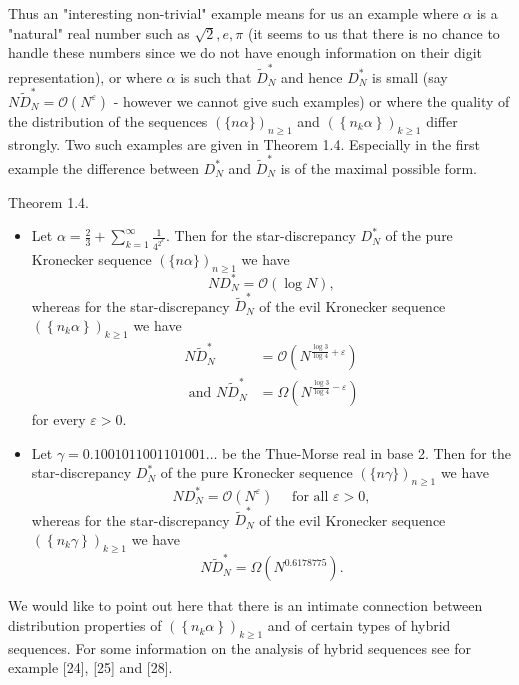 \documentclass[10pt]{article}
\begin{document}
Thus an "interesting non-trivial" example means for us an example where $\alpha$ is a "natural" real number such as $\sqrt{2}, e, \pi$ (it seems to us that there is no chance to handle these numbers since we do not have enough information on their digit representation), or where $\alpha$ is such that $\widetilde{D}_{N}^{*}$ and hence $D_{N}^{*}$ is small (say $N \widetilde{D}_{N}^{*}=\mathcal{O}\left(N^{\varepsilon}\right)$ - however we cannot give such examples) or where the quality of the distribution of the sequences $(\{n \alpha\})_{n \geqslant 1}$ and $\left(\left\{n_{k} \alpha\right\}\right)_{k \geqslant 1}$ differ strongly. Two such examples are given in Theorem 1.4. Especially in the first example the difference between $D_{N}^{*}$ and $\widetilde{D}_{N}^{*}$ is of the maximal possible form.

Theorem 1.4.

\begin{itemize}
  \item[(a)] Let $\alpha=\frac{2}{3}+\sum_{k=1}^{\infty} \frac{1}{4^{2^{k}}}$. Then for the star-discrepancy $D_{N}^{*}$ of the pure Kronecker sequence $(\{n \alpha\})_{n \geqslant 1}$ we have
$$
N D_{N}^{*}=\mathcal{O}(\log N),
$$
whereas for the star-discrepancy $\widetilde{D}_{N}^{*}$ of the evil Kronecker sequence $\left(\left\{n_{k} \alpha\right\}\right)_{k \geqslant 1}$ we have
$$
\begin{aligned}
N \widetilde{D}_{N}^{*} & =\mathcal{O}\left(N^{\frac{\log 3}{\log 4}+\varepsilon}\right) \\
\text { and } N \widetilde{D}_{N}^{*} & =\Omega\left(N^{\frac{\log 3}{\log 4}-\varepsilon}\right)
\end{aligned}
$$
for every $\varepsilon>0$.
  \item[(b)] Let $\gamma=0.1001011001101001 \ldots$ be the Thue-Morse real in base 2. Then for the star-discrepancy $D_{N}^{*}$ of the pure Kronecker sequence $(\{n \gamma\})_{n \geqslant 1}$ we have
$$
N D_{N}^{*}=\mathcal{O}\left(N^{\varepsilon}\right) \quad \text { for all } \varepsilon>0,
$$
whereas for the star-discrepancy $\widetilde{D}_{N}^{*}$ of the evil Kronecker sequence $\left(\left\{n_{k} \gamma\right\}\right)_{k \geqslant 1}$ we have
$$
N \widetilde{D}_{N}^{*}=\Omega\left(N^{0.6178775}\right) .
$$
\end{itemize}

We would like to point out here that there is an intimate connection between distribution properties of $\left(\left\{n_{k} \alpha\right\}\right)_{k \geqslant 1}$ and of certain types of hybrid\\[0pt]
sequences. For some information on the analysis of hybrid sequences see for example [24], [25] and [28].
\end{document}
